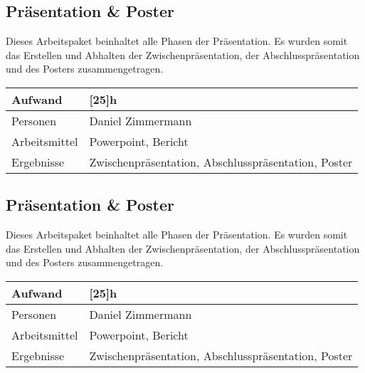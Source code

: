 	\subsection{Präsentation \& Poster}
	\label{sec:Pras}
	Dieses Arbeitspaket beinhaltet alle Phasen der Präsentation.  Es wurden somit das Erstellen und Abhalten der Zwischenpräsentation, der Abschlusspräsentation und des Posters zusammengetragen.   \\
	\begin{tabularx}{\textwidth}{|l|X|}
		\hline
		Aufwand & [25]{h} \\\hline
		Personen & Daniel Zimmermann \\\hline
		Arbeitsmittel & Powerpoint, Bericht \\\hline
		Ergebnisse & Zwischenpräsentation, Abschlusspräsentation, Poster  \\\hline
	\end{tabularx}
	
	
	\subsection{Präsentation \& Poster}
	\label{sec:Praesi}
	Dieses Arbeitspaket beinhaltet alle Phasen der Präsentation.  Es wurden somit das Erstellen und Abhalten der Zwischenpräsentation, der Abschlusspräsentation und des Posters zusammengetragen.   \\
	\begin{tabularx}{\textwidth}{|l|X|}
		\hline
		Aufwand & [25]{h} \\\hline
		Personen & Daniel Zimmermann \\\hline
		Arbeitsmittel & Powerpoint, Bericht \\\hline
		Ergebnisse & Zwischenpräsentation, Abschlusspräsentation, Poster  \\\hline
	\end{tabularx}
	
	
	
